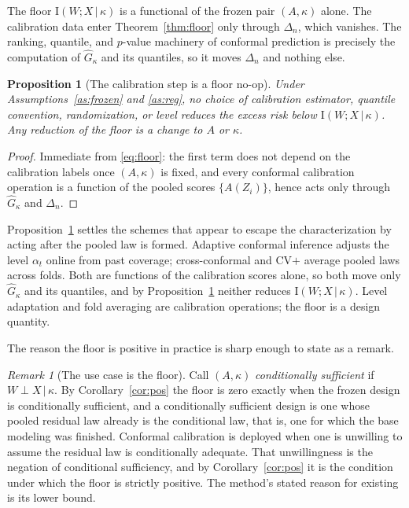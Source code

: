 \documentclass[11pt]{article}
\newtheorem{proposition}[theorem]{Proposition}
\theoremstyle{definition}
\theoremstyle{remark}
\newtheorem{remark}[theorem]{Remark}
\newcommand{\I}{\mathrm{I}}
\newcommand{\given}{\,|\,}
\begin{document}
The floor $\I(W;X\given\kappa)$ is a functional of the frozen pair $(A,\kappa)$ alone.
The calibration data enter Theorem~\ref{thm:floor} only through $\Delta_n$, which
vanishes. The ranking, quantile, and $p$-value machinery of conformal prediction is
precisely the computation of $\widehat G_\kappa$ and its quantiles, so it moves
$\Delta_n$ and nothing else.

\begin{proposition}[The calibration step is a floor no-op]\label{prop:noop}
Under Assumptions~\ref{as:frozen} and \ref{as:reg}, no choice of calibration estimator,
quantile convention, randomization, or level reduces the excess risk below
$\I(W;X\given\kappa)$. Any reduction of the floor is a change to $A$ or $\kappa$.
\end{proposition}

\begin{proof}
Immediate from \eqref{eq:floor}: the first term does not depend on the calibration
labels once $(A,\kappa)$ is fixed, and every conformal calibration operation is a
function of the pooled scores $\{A(Z_i)\}$, hence acts only through $\widehat G_\kappa$
and $\Delta_n$.
\end{proof}

Proposition~\ref{prop:noop} settles the schemes that appear to escape the
characterization by acting after the pooled law is formed. Adaptive conformal
inference \citep{gibbs2021adaptive} adjusts the level $\alpha_t$ online from past
coverage; cross-conformal and CV$+$ average pooled laws across folds. Both are
functions of the calibration scores alone, so both move only $\widehat G_\kappa$ and
its quantiles, and by Proposition~\ref{prop:noop} neither reduces
$\I(W;X\given\kappa)$. Level adaptation and fold averaging are calibration
operations; the floor is a design quantity.

The reason the floor is positive in practice is sharp enough to state as a remark.

\begin{remark}[The use case is the floor]\label{rem:self}
Call $(A,\kappa)$ \emph{conditionally sufficient} if $W \perp X \given \kappa$. By
Corollary~\ref{cor:pos} the floor is zero exactly when the frozen design is
conditionally sufficient, and a conditionally sufficient design is one whose pooled
residual law already is the conditional law, that is, one for which the base modeling
was finished. Conformal calibration is deployed when one is unwilling to assume the
residual law is conditionally adequate. That unwillingness is the negation of
conditional sufficiency, and by Corollary~\ref{cor:pos} it is the condition under which
the floor is strictly positive. The method's stated reason for existing is its lower
bound.
\end{remark}
\end{document}
